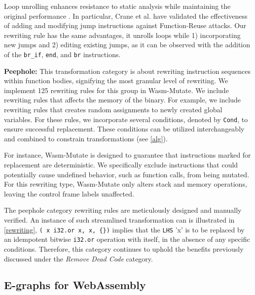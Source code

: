 \documentclass[sigplan,screen]{acmart}
\newcommand*\badge[1]{ \colorbox{red}{\color{white}#1}}
\newcommand{\tool}{{\sc Wasm-Mutate}\xspace}
\newcommand{\todo}[1]{%
\refstepcounter{todo}
\noindent\textbf{\badge{TODO}} {\color{red}#1}
\addcontentsline{td}{todo}
{\color{red}\thesection.\thetodo\xspace #1}}
\begin{document}
Loop unrolling enhances resistance to static analysis while maintaining the original performance \cite{10.1145/3453483.3454035}. 
In particular, Crane et al. \cite{10.1145/2810103.2813682} have validated the effectiveness of adding and modifying jump instructions against Function-Reuse attacks.
Our rewriting rule has the same advantages, it unrolls loops while 1) incorporating new jumps and 2) editing existing jumps, as it can be observed with the addition of the \texttt{br_if}, \texttt{end}, and \texttt{br} instructions. 



\textbf{Peephole:} 
This transformation category is about rewriting instruction sequences within function bodies, signifying the most granular level of rewriting. 
We implement 125 rewriting rules for this group in \tool. 
We include rewriting rules that affects the memory of the binary.
For example, we include rewriting rules that creates random assignments to newly created global variables.
For these rules, we incorporate several conditions, denoted by \texttt{Cond}, to ensure successful replacement. 
These conditions can be utilized interchangeably and combined to constrain transformations (see \autoref{alg}).

For instance, \tool is designed to guarantee that instructions marked for replacement are deterministic. 
We specifically exclude instructions that could potentially cause undefined behavior, such as function calls, from being mutated. 
For this rewriting type, \tool only alters stack and memory operations, leaving the control frame labels unaffected.

The peephole category rewriting rules are meticulously designed and manually verified. 
An instance of such streamlined transformation can is illustrated in \autoref{rewriting}, \texttt{(\ x\ i32.or\ x, x, \{\})} implies that the \texttt{LHS} 'x' is to be replaced by an idempotent bitwise \texttt{i32.or} operation with itself, in the absence of any specific conditions.
Therefore, this category continues to uphold the benefits previously discussed under the \emph{Remove Dead Code} category.


\subsection{E-graphs for WebAssembly}
\label{alg}
\end{document}
